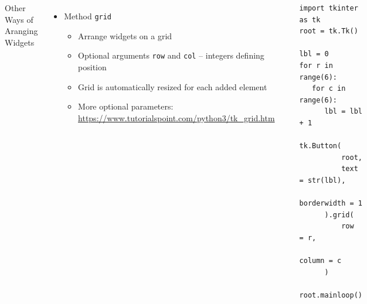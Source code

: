 \begin{frame}[fragile]
%
\begin{columns}[T]
\begin{Large}
	{Other Ways of Aranging Widgets}
\end{Large}
\begin{itemize}
\item Method \texttt{grid}
	\begin{itemize}
	\item Arrange widgets on a grid
	\item Optional arguments \texttt{row} and \texttt{col} -- integers defining position
	\item Grid is automatically resized for each added element
	\item More optional parameters: {\scriptsize \url{https://www.tutorialspoint.com/python3/tk_grid.htm}}
	\end{itemize}
\end{itemize}
\begin{center}
\includegraphics[width=.35\linewidth]{./gfx/tk-grid}
\end{center}
%
\begin{codebox}
\begin{verbatim}
import tkinter as tk
root = tk.Tk()

lbl = 0
for r in range(6):
   for c in range(6):
      lbl = lbl + 1
      tk.Button(
          root, 
          text = str(lbl),
          borderwidth = 1
      ).grid(
          row    = r,
          column = c
      )

root.mainloop()
\end{verbatim}
\end{codebox}
\end{columns}
%
\end{frame}


